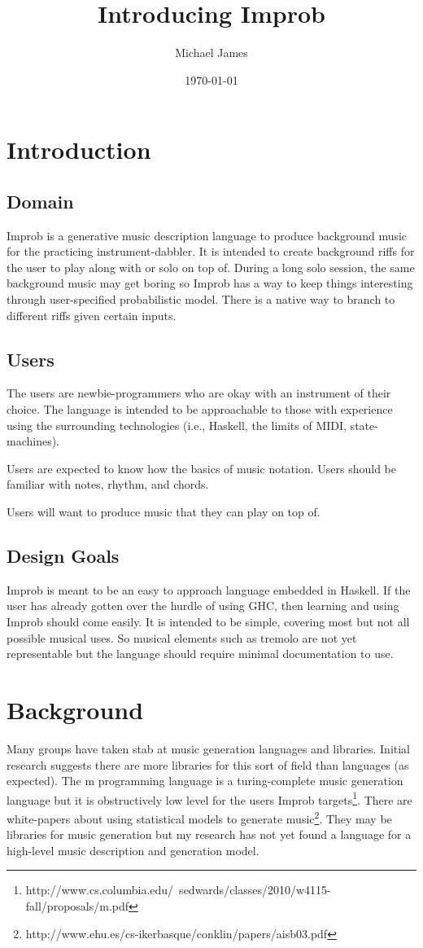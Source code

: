 \documentclass{article}
\title{Introducing Improb}
\author{Michael James}
\date{\today}
\begin{document}
\maketitle

\section{Introduction}
\subsection{Domain}
Improb is a generative music description language to produce background music for the practicing instrument-dabbler. It is intended to create background riffs for the user to play along with or solo on top of. During a long solo session, the same background music may get boring so Improb has a way to keep things interesting through user-specified probabilistic model. There is a native way to branch to different riffs given certain inputs.

\subsection{Users}
The users are newbie-programmers who are okay with an instrument of their choice. The language is intended to be approachable to those with experience using the surrounding technologies (i.e., Haskell, the limits of MIDI, state-machines).

Users are expected to know how the basics of music notation. Users should be familiar with notes, rhythm, and chords.

Users will want to produce music that they can play on top of.

\subsection{Design Goals}
Improb is meant to be an easy to approach language embedded in Haskell. If the user has already gotten over the hurdle of using GHC, then learning and using Improb should come easily. It is intended to be simple, covering most but not all possible musical uses. So musical elements such as tremolo are not yet representable but the language should require minimal documentation to use.

\section{Background}
Many groups have taken stab at music generation languages and libraries. Initial research suggests there are more libraries for this sort of field than languages (as expected). The m programming language is a turing-complete music generation language but it is obstructively low level for the users Improb targets\footnote{http://www.cs.columbia.edu/~sedwards/classes/2010/w4115-fall/proposals/m.pdf}. There are white-papers about using statistical models to generate music\footnote{http://www.ehu.es/cs-ikerbasque/conklin/papers/aisb03.pdf}. They may be libraries for music generation but my research has not yet found a language for a high-level music description and generation model.
\end{document}

